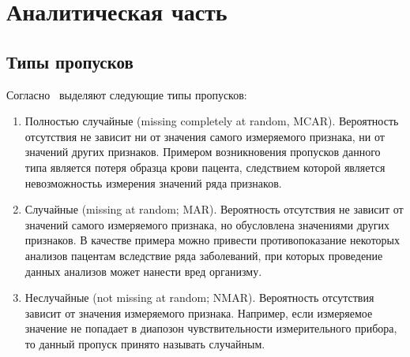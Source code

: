 \chapter{Аналитическая часть} \label{chapt1}

\section{Типы пропусков} \label{sect1_1}

Согласно~\cite{little2002statistical} выделяют следующие типы
пропусков:
\begin{enumerate}
  \item Полностью случайные (missing completely at random,
    MCAR). Вероятность отсутствия не зависит ни от значения самого
    измеряемого признака, ни от значений других признаков. Примером
    возникновения пропусков данного типа является потеря образца крови
    пацента, следствием которой является невозможностьь измерения значений
    ряда признаков.
  \item Случайные (missing at random; MAR). Вероятность отсутствия не
    зависит от значений самого измеряемого признака, но обусловлена
    значениями других признаков. В качестве примера можно привести
    противопоказание некоторых анализов пацентам вследствие ряда
    заболеваний, при которых проведение данных анализов может нанести вред
    организму.
  \item Неслучайные (not missing at random; NMAR). Вероятность
    отсутствия зависит от значения измеряемого признака. Например, если
    измеряемое значение не попадает в диапозон чувствительности
    измерительного прибора, то данный пропуск принято называть случайным.
\end{enumerate}
